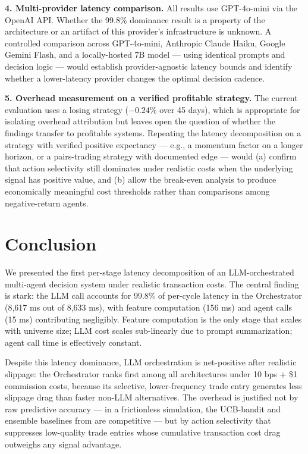 \documentclass[10pt,conference]{IEEEtran}
\begin{document}
\textbf{4. Multi-provider latency comparison.}
All results use GPT-4o-mini via the OpenAI API. Whether the 99.8\% dominance result is a property of the architecture or an artifact of this provider's infrastructure is unknown. A controlled comparison across GPT-4o-mini, Anthropic Claude Haiku, Google Gemini Flash, and a locally-hosted 7B model --- using identical prompts and decision logic --- would establish provider-agnostic latency bounds and identify whether a lower-latency provider changes the optimal decision cadence.

\textbf{5. Overhead measurement on a verified profitable strategy.}
The current evaluation uses a losing strategy ($-0.24\%$ over 45 days), which is appropriate for isolating overhead attribution but leaves open the question of whether the findings transfer to profitable systems. Repeating the latency decomposition on a strategy with verified positive expectancy --- e.g., a momentum factor on a longer horizon, or a pairs-trading strategy with documented edge --- would (a) confirm that action selectivity still dominates under realistic costs when the underlying signal has positive value, and (b) allow the break-even analysis to produce economically meaningful cost thresholds rather than comparisons among negative-return agents.


\section{Conclusion}

We presented the first per-stage latency decomposition of an LLM-orchestrated multi-agent decision system under realistic transaction costs. The central finding is stark: the LLM call accounts for 99.8\% of per-cycle latency in the Orchestrator (8,617 ms out of 8,633 ms), with feature computation (156 ms) and agent calls (15 ms) contributing negligibly. Feature computation is the only stage that scales with universe size; LLM cost scales sub-linearly due to prompt summarization; agent call time is effectively constant.

Despite this latency dominance, LLM orchestration is net-positive after realistic slippage: the Orchestrator ranks first among all architectures under 10 bps + \$1 commission costs, because its selective, lower-frequency trade entry generates less slippage drag than faster non-LLM alternatives. The overhead is justified not by raw predictive accuracy --- in a frictionless simulation, the UCB-bandit and ensemble baselines from \cite{companion} are competitive --- but by action selectivity that suppresses low-quality trade entries whose cumulative transaction cost drag outweighs any signal advantage.
\end{document}
